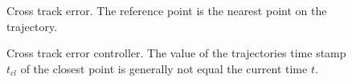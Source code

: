 \begin{figure}[H]
    \centering
    \def\svgwidth{0.5\columnwidth}
    
    \caption{Cross track error. The reference point is the nearest point on the trajectory.}
    \label{fig:scene_crossTrack}
\end{figure}


\begin{figure}[H]
    \centering
    \def\svgwidth{\columnwidth}
    
    \caption{Cross track error controller. The value of the trajectories time stamp $t_{cl}$ of the closest point is generally not equal the current time $t$.}
    \label{fig:crossTrack}
\end{figure}


%

